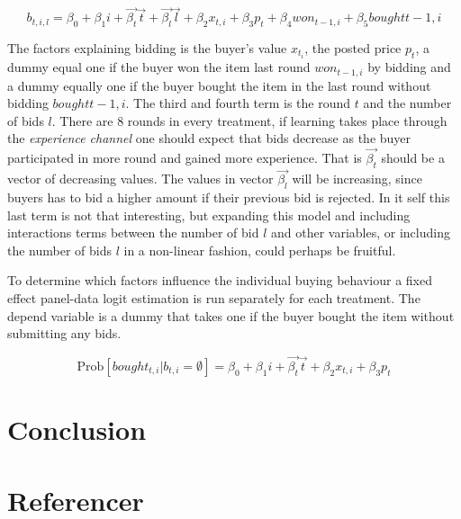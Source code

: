 \documentclass[a4paper,12pt]{article}
\begin{document}
	\[ b_{t,i,l} = \beta_0 + \beta_1 i + \vec{\beta_t} \vec{t} + \vec{\beta_l} \vec{l} + \beta_2 x_{t,i} + \beta_3 p_t + \beta_4 won_{t-1,i} + \beta_5 bought{t-1,i} \]

	The factors explaining bidding is the buyer's value $x_{t_i}$, the posted price $p_t$, a dummy equal one if the buyer won the item last round $won_{t-1,i}$ by bidding and a dummy equally one if the buyer bought the item in the last round without bidding $bought{t-1,i}$. The third and fourth term is the round $t$ and the number of bids $l$. There are 8 rounds in every treatment, if learning takes place through the \emph{experience channel} one should expect that bids decrease as the buyer participated in more round and gained more experience. That is $\vec{\beta_t}$ should be a vector of decreasing values. The values in vector $\vec{\beta_l}$ will be increasing, since buyers has to bid a higher amount if their previous bid is rejected. In it self this last term is not that interesting, but expanding this model and including interactions terms between the number of bid $l$ and other variables, or including the number of bids $l$ in a non-linear fashion, could perhaps be fruitful.

	To determine which factors influence the individual buying behaviour a fixed effect  panel-data logit estimation is run separately for each treatment. The depend variable is a dummy that takes one if the buyer bought the item without submitting any bids.

	\[ \mbox{Prob}[bought_{t,i} | b_{t,i} = \emptyset]  = \beta_0 + \beta_1 i + \vec{\beta_t} \vec{t} + \beta_2 x_{t,i} + \beta_3 p_t \]

	
	\section{Conclusion}
			
	
			
	\newpage
	\appendix
	
	\begingroup
		\section{Referencer}
		
		\nocite{*}
		\renewcommand{\section}[2]{}%
		\raggedright
		
	\endgroup
	
\end{document}
